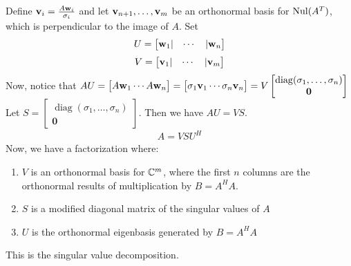 \documentclass{article}
\begin{document}
    Define $\mathbf{v}_i = \frac{A\mathbf{w}_i}{\sigma_i}$ and let $\mathbf{v}_{n+1}, \ldots, \mathbf{v}_{m}$ be an orthonormal basis for $\operatorname{Nul}(A^T)$, which is perpendicular to the image of $A$. Set
    \[U = \begin{bmatrix}
        \mathbf{w}_1 | & \cdots & | \mathbf{w}_n
    \end{bmatrix}\]
    \[V = \begin{bmatrix}
        \mathbf{v}_1 | & \cdots & | \mathbf{v}_m
    \end{bmatrix}
    \]
    Now, notice that $AU = \begin{bmatrix}
        A\mathbf{w}_1 \cdots A\mathbf{w}_n
    \end{bmatrix} = \begin{bmatrix}
        \sigma_1\mathbf{v}_1 \cdots \sigma_n\mathbf{v}_n
    \end{bmatrix} = V \begin{bmatrix}
        \operatorname{diag}(\sigma_1, \ldots, \sigma_n) \\
        \mathbf{0}
    \end{bmatrix}$
    Let $S =\begin{bmatrix}
        \operatorname{diag}(\sigma_1, \ldots, \sigma_n) \\
        \mathbf{0}
    \end{bmatrix}$. Then we have $AU = VS$.
    \begin{align}
        A = VSU^H
    \end{align}
    Now, we have a factorization where:
    \begin{enumerate}
        \item $V$ is an orthonormal basis for $\mathbb{C}^m$, where the first $n$ columns are the orthonormal results of multiplication by $B= A^H A$.
        \item $S$ is a modified diagonal matrix of the singular values of $A$
        \item $U$ is the orthonormal eigenbasis generated by $B = A^H A$
    \end{enumerate}
    This is the singular value decomposition.
\end{document}
